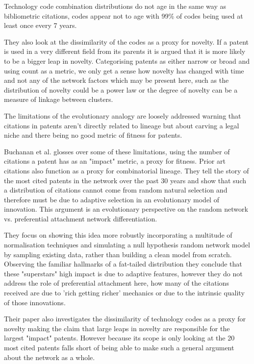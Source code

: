 Technology code combination distributions do not age in the same way as bibliometric citations, codes appear not to age with 99\% of codes being used at least once every 7 years. 

They also look at the dissimilarity of the codes as a proxy for novelty. If a patent is used in a very different field from its parents it is argued that it is more likely to be a bigger leap in novelty. Categorising patents as either narrow or broad and using count as a metric, we only get a sense how novelty has changed with time and not any of the network factors which may be present here, such as the distribution of novelty could be a power law or the degree of novelty can be a measure of linkage between clusters. 

The limitations of the evolutionary analogy are loosely addressed warning that citations in patents aren't directly related to lineage but about carving a legal niche and there being no good metric of fitness for patents. 

Buchanan et al.\cite{buchanan2011measuring} glosses over some of these limitations, using the number of citations a patent has as an "impact" metric, a proxy for fitness. Prior art citations also function as a proxy for combinatorial lineage. They tell the story of the most cited patents in the network over the past 30 years and show that such a distribution of citations cannot come from random natural selection and therefore must be due to adaptive selection in an evolutionary model of innovation. This argument is an evolutionary perspective on the random network vs. preferential attachment network differentiation. 

They focus on showing this idea more robustly incorporating a multitude of normalisation techniques and simulating a null hypothesis random network model by sampling existing data, rather than building a clean model from scratch. Observing the familiar hallmarks of a fat-tailed distribution they conclude that these "superstars" high impact is due to adaptive features, however they do not address the role of preferential attachment here, how many of the citations received are due to 'rich getting richer' mechanics or due to the intrinsic quality of those innovations. 

Their paper also investigates the dissimilarity of technology codes as a proxy for novelty making the claim that large leaps in novelty are responsible for the largest "impact" patents. However because its scope is only looking at the 20 most cited patents falls short of being able to make such a general argument about the network as a whole. 

